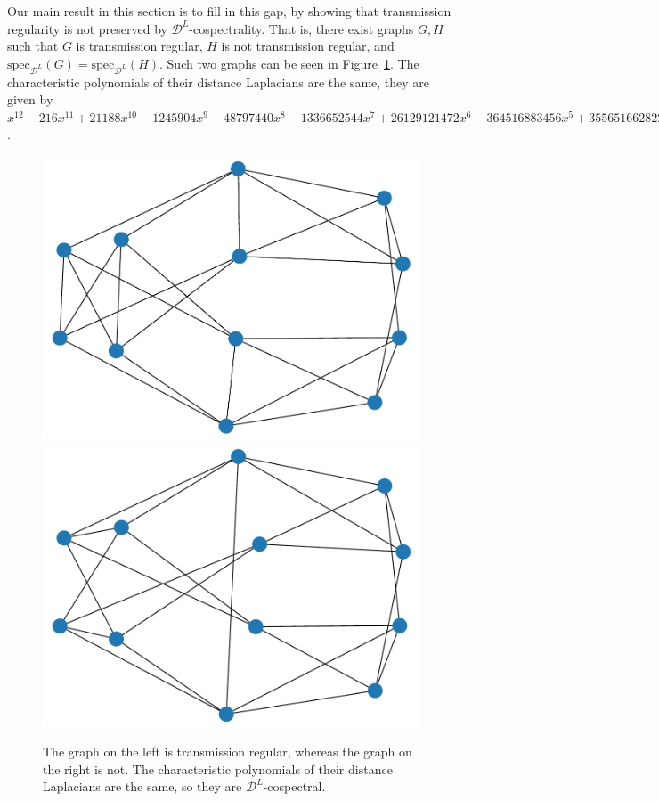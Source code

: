 \documentclass[11pt,english]{article}
\theoremstyle{plain}
\theoremstyle{remark}
\begin{document}
Our main result in this section is to fill in this gap, by showing that transmission regularity is not preserved by $\mathcal{D}^L$-cospectrality. That is, there exist graphs $G,H$ such that $G$ is transmission regular, $H$ is not transmission regular, and  $\text{spec}_{\mathcal{D}^L}(G)=\text{spec}_{\mathcal{D}^L}(H)$. Such two graphs can be seen in Figure~\ref{fig:cospectral}. The characteristic polynomials of their distance Laplacians are the same, they are given by $x^{12} - 216 x^{11} + 21188 x^{10} - 1245904 x^9 + 48797440 x^8 - 1336652544 x^7 + 26129121472 x^6 - 364516883456 x^5 + 3556516628224 x^4 - 23113129559040 x^3 + 90045806284800 x^2 - 159318669312000 x$.




\begin{figure}[hbt]
    \centering
    \includegraphics[scale=0.4]{trreg.pdf}
    \includegraphics[scale=0.4]{trregnot.pdf}
    \caption{The graph on the left is transmission regular, whereas the graph on the right is not. The characteristic polynomials of their distance Laplacians are the same, so they are $\mathcal{D}^L$-cospectral.}
    \label{fig:cospectral}
\end{figure}
\end{document}

